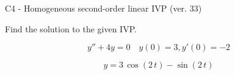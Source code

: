 \begin{exercise}
  \begin{exerciseTitle}C4 - Homogeneous second-order linear IVP (ver. 33)\end{exerciseTitle}
  \begin{exerciseStatement}
    
Find the solution to the given IVP.

    
\[y''+4y = 0 \hspace{1em} y(0) = 3 , y'(0) = -2\]

  \end{exerciseStatement}
  \begin{exerciseAnswer}
    
\[y= 3 \, \cos\left(2 \, t\right) - \sin\left(2 \, t\right)\]

  \end{exerciseAnswer}
\end{exercise}